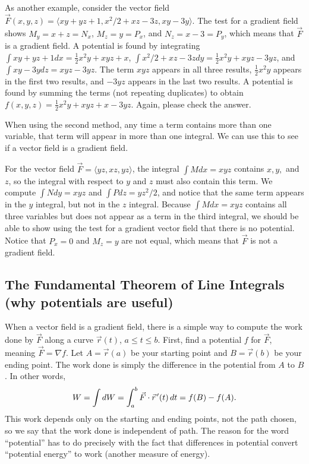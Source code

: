 \begin{example}
  As another example, consider the
  vector field $\vec F(x,y,z) = \langle
  xy+yz+1,x^2/2+xz-3z,xy-3y\rangle$.  The test for a gradient field
  shows $M_y=x+z=N_x$, $M_z=y=P_x$, and $N_z=x-3=P_y$, which means
  that $\vec F$ is a gradient field.  A potential is found by
  integrating $\int xy+yz+1 dx = \frac12x^2y+xyz+x$, $\int x^2/2+xz-3z
  dy =\frac12x^2y+xyz-3yz$, and $\int xy-3y dz = xyz-3yz$. The term
  $xyz$ appears in all three results, $\frac12x^2y$ appears in the
  first two results, and $-3yz$ appears in the last two results. A
  potential is found by summing the terms (not repeating duplicates)
  to obtain $f(x,y,z) = \frac 1 2 x^2y+xyz+x-3yz$.  Again, please
  check the answer.
\end{example}
When using the second method, any time a term contains more than one
variable, that term will appear in more than one integral. We can use
this to see if a vector field is a gradient field.

\begin{example}
For the
vector field $\vec F = \langle yz,xz,yz\rangle$, the integral $\int Mdx = xyz$
contains $x,y,$ and $z$, so the integral with respect to $y$ and $z$
must also contain this term.  We compute $\int Ndy = xyz$ and $\int Pdz =
yz^2/2$, and notice that the same term appears in the $y$ integral,
but not in the $z$ integral. Because $\int Mdx = xyz$ contains all three
variables but does not appear as a term in the third integral, we
should be able to show using the test for a gradient vector
field that there is no potential.  Notice that $P_x=0$ and $M_z=y$
are not equal, which means that $\vec F$ is not a gradient field.
\end{example}

\subsection{The Fundamental Theorem of Line Integrals (why potentials
are useful)}
When a vector field is a gradient field, there is a simple way to
compute the work done by $\vec F$ along a curve $\vec r(t)$, $a\leq t\leq b$.
First, find a potential $f$ for $\vec F$, meaning $\vec F =\nabla f$. Let
$A=\vec r(a)$ be your starting point and $B=\vec r(b)$ be your ending
point. The work done is simply the difference in the potential from
$A$ to $B$.  In other words, 
$$W =\int dW= \int_a^b \vec F \cdot \vec r^{\,\prime}(t) \,dt =f(B)-f(A).$$ 
This work depends only on the starting and ending points, not the path
chosen, so we say that the work done is independent of path.  The
reason for the word ``potential'' has to do precisely with the fact
that differences in potential convert ``potential energy'' to work
(another measure of energy).

